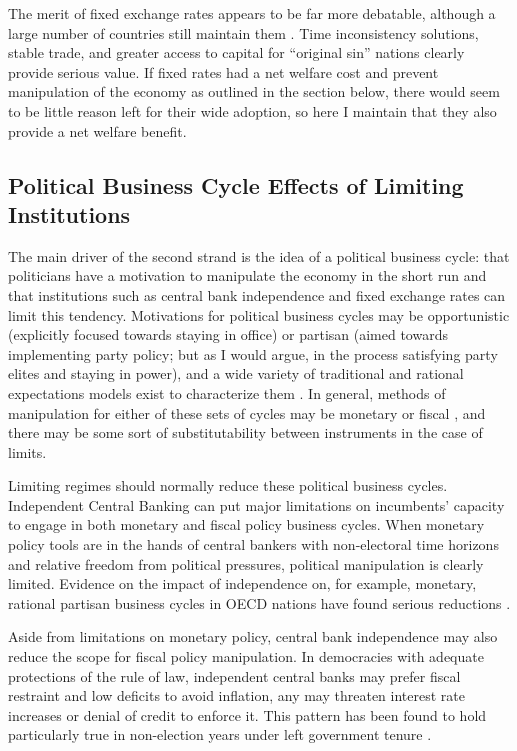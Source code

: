 \documentclass{article}
\begin{document}
    The merit of fixed exchange rates appears to be far more debatable, although a large number of countries still maintain them \citep{ilzetzki_irr_2019}. Time inconsistency solutions, stable trade, and greater access to capital for “original sin” nations clearly provide serious value. If fixed rates had a net welfare cost and prevent manipulation of the economy as outlined in the section below, there would seem to be little reason left for their wide adoption, so here I maintain that they also provide a net welfare benefit.

    \subsection*{Political Business Cycle Effects of Limiting Institutions}

    The main driver of the second strand is the idea of a political business cycle: that politicians have a motivation to manipulate the economy in the short run and that institutions such as central bank independence and fixed exchange rates can limit this tendency. Motivations for political business cycles may be opportunistic (explicitly focused towards staying in office) or partisan (aimed towards implementing party policy; but as I would argue, in the process satisfying party elites and staying in power), and a wide variety of traditional and rational expectations models exist to characterize them \citep{alesina_political_1997}. In general, methods of manipulation for either of these sets of cycles may be monetary or fiscal \citep{fortunato_cabinet_2018}, and there may be some sort of substitutability between instruments in the case of limits.

    Limiting regimes should normally reduce these political business cycles. Independent Central Banking can put major limitations on incumbents’ capacity to engage in both monetary and fiscal policy business cycles. When monetary policy tools are in the hands of central bankers with non-electoral time horizons and relative freedom from political pressures, political manipulation is clearly limited. Evidence on the impact of independence on, for example, monetary, rational partisan business cycles in OECD nations have found serious reductions \citep{maloney_political_2003}.
    
    Aside from limitations on monetary policy, central bank independence may also reduce the scope for fiscal policy manipulation. In democracies with adequate protections of the rule of law, independent central banks may prefer fiscal restraint and low deficits to avoid inflation, any may threaten interest rate increases or denial of credit to enforce it. This pattern has been found to hold particularly true in non-election years under left government tenure \citep{bodea_central_2017}.
    
\end{document}
